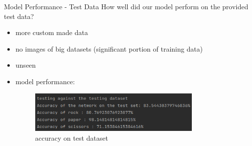 \documentclass[aspectratio=169]{beamer}
\begin{document}
{	\begin{frame}{Model Performance - Test Data}
	How well did our model perform on the provided test data?
	\begin{itemize}
		\item more custom made data
		\item no images of big datasets (significant portion of training data)
		\item unseen
		\pause
		\item model performance:
		\newline
		\begin{figure}
			\centering
			\includegraphics[width=0.8\textwidth]{img/TestAccuracy_final_test.png}
			\caption{accuracy on test dataset}
		\end{figure}   
	\end{itemize}
	\end{frame}

}
\end{document}
